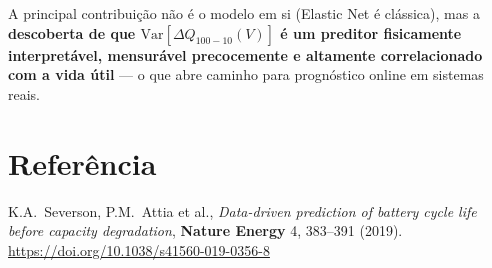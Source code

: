 \documentclass[12pt,a4paper]{article}
\begin{document}
A principal contribui\c{c}\~ao n\~ao \'{e} o modelo em si (Elastic Net \'{e} cl\'{a}ssica),
mas a \textbf{descoberta de que $\text{Var}[\Delta Q_{100-10}(V)]$ \'{e} um
preditor fisicamente interpret\'{a}vel, mensur\'{a}vel precocemente e altamente
correlacionado com a vida \'{u}til} --- o que abre caminho para progn\'{o}stico
online em sistemas reais.

\section*{Refer\^{e}ncia}

K.A.~Severson, P.M.~Attia et al.,
\textit{Data-driven prediction of battery cycle life before capacity degradation},
\textbf{Nature Energy} 4, 383--391 (2019).\\
\url{https://doi.org/10.1038/s41560-019-0356-8}
\end{document}
